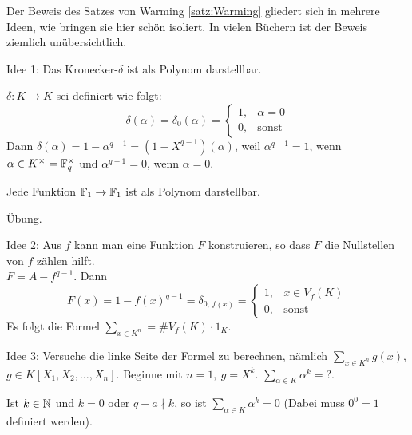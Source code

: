 \documentclass[a4paper,DIV15,BCOR12mm]{article}
\begin{document}
\begin{beweis}
Der Beweis des Satzes von Warming \ref{satz:Warming} gliedert sich
in mehrere Ideen, wie bringen sie hier schön isoliert. In vielen
Büchern ist der Beweis ziemlich unübersichtlich.
\begin{description}
    \item{Idee 1:} Das Kronecker-$\delta$ ist als Polynom darstellbar.

        \begin{lemma}\label{lemma:BeweisWarmingLemma1}
            $\delta:K\to K$ sei definiert wie folgt:
            \[\delta(\alpha)=\delta_0(\alpha)=\begin{cases}1,&\alpha=0\\0,&\text{sonst}\end{cases}\]
            Dann
            $\delta(\alpha)=1-\alpha^{q-1}=(1-X^{q-1})(\alpha)$,
            weil $\alpha^{q-1}=1$, wenn $\alpha \in
            K^{\times}=\mathbb{F}_q^{\times}$ und $\alpha^{q-1}=0$, wenn
            $\alpha=0$.
        \end{lemma}
        \begin{satz}
            Jede Funktion $\mathbb{F}_1 \to \mathbb{F}_1$ ist als Polynom
            darstellbar.
        \end{satz}
        \begin{beweis} Übung. \end{beweis}
    \item{Idee 2:} Aus $f$ kann man eine Funktion $F$ konstruieren, so
    dass $F$ die Nullstellen von $f$ zählen hilft.\\
    $F=A-f^{q-1}$. Dann
    \[F(x)=1-f(x)^{q-1}=\delta_{0,\,f(x)}=\begin{cases}1,&x\in
    V_f(K)\\0,&\text{sonst}\end{cases}\]
    Es folgt die Formel $\sum_{x\in K^n}=\# V_f(K) \cdot 1_K$.
    \item{Idee 3:} Versuche die linke Seite der Formel zu
    berechnen, nämlich $\sum_{x\in K^n}g(x)$, $
    {g\in K[X_1,X_2,\dotsc,X_n]}$. Beginne mit $n=1,\ g=X^k$.
    $\sum_{\alpha \in K}\alpha^k=?$.
    \begin{lemma}\label{lemma:BeweisWarmingLemma2}
        Ist $k\in \mathbb{N}$ und $k=0$ oder $q-a \nmid k$, so ist $\sum_{\alpha \in K}
        \alpha^k=0$ (Dabei muss $0^0=1$ definiert werden).
    \end{lemma}
\end{description}
\end{beweis}
\end{document}
